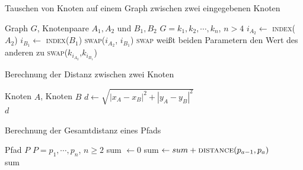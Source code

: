 \begin{algorithm}
    \caption{Tauschen von Knoten auf einem Graph zwischen zwei eingegebenen Knoten}
    \label{alg:swap-nodes-inbetween}
    \begin{algorithmic}[1]
        \Require Graph $G$, Knotenpaare $A_1,A_2$ und $B_1,B_2$
        \Require $G=k_1,k_2,\cdots,k_n$, $n>4$
        \State $i_{A_2} \gets$ \textsc{index}($A_2$)
        \State $i_{B_1} \gets$ \textsc{index}($B_1$)
            \State \textsc{swap}($i_{A_2}$, $i_{B_1}$) 
            \Comment \textsc{swap} weißt beiden Parametern den Wert des anderen zu
        \EndIf
            \State \textsc{swap}($k_{i_{A_2}}$,$k_{i_{B_1}}$)
        \EndWhile
    \end{algorithmic}
\end{algorithm}

\begin{algorithm}
    \caption{Berechnung der Distanz zwischen zwei Knoten}
    \label{alg:calc-distance-two-nodes}
    \begin{algorithmic}[1]
        \Require Knoten $A$, Knoten $B$
        \State $d \gets \sqrt{|x_A - x_B|^2 + |y_A - y_B|^2}$\\
        \Return $d$
    \end{algorithmic}
\end{algorithm}

\begin{algorithm}
    \caption{Berechnung der Gesamtdistanz eines Pfads}
    \label{alg:calc-total-distance}
    \begin{algorithmic}[1]
        \Require Pfad $P$
        \Require $P=p_1,\cdots,p_n$, $n \geq 2$
        \State sum $\gets 0$
            \State sum $\gets sum + \textrm{\textsc{distance}}(p_{a-1}, p_a)$
        \EndFor\\
        \Return sum
    \end{algorithmic}
\end{algorithm}

